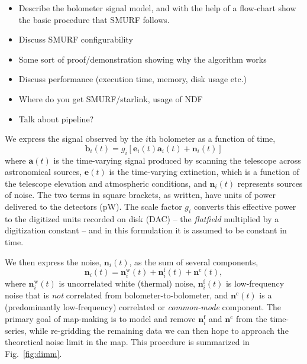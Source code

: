 \documentclass[useAMS,usenatbib,nofootinbib]{mn2e}
\begin{document}
\begin{itemize}

\item Describe the bolometer signal model, and with the help of a flow-chart
show the basic procedure that SMURF follows.

\item Discuss SMURF configurability

\item Some sort of proof/demonstration showing why the algorithm works

\item Discuss performance (execution time, memory, disk usage etc.)

\item Where do you get SMURF/starlink, usage of NDF

\item Talk about pipeline?

\end{itemize}

We express the signal observed by the $i$th bolometer as a function of time,
\begin{equation}
\mathbf{b}_i(t) = g_i[\mathbf{e}_i(t) \mathbf{a}_i(t) + \mathbf{n}_i(t)]
\end{equation}
where $\mathbf{a}(t)$ is the time-varying signal produced by scanning
the telescope across astronomical sources, $\mathbf{e}(t)$ is the
time-varying extinction, which is a function of the telescope
elevation and atmospheric conditions, and $\mathbf{n}_i(t)$ represents
sources of noise. The two terms in square brackets, as written, have
units of power delivered to the detectors (pW). The scale factor $g_i$
converts this effective power to the digitized units recorded on disk
(DAC) -- the \emph{flatfield} multiplied by a digitization constant --
and in this formulation it is assumed to be constant in time.

We then express the noise, $\mathbf{n}_i(t)$, as the sum of several
components,
%
\begin{equation}
  \mathbf{n}_i(t) = \mathbf{n}^\mathrm{w}_i(t) + \mathbf{n}^\mathrm{f}_i(t) +
  \mathbf{n}^\mathrm{c}(t),
\label{eq:noise}
\end{equation}
%
where $\mathbf{n}^\mathrm{w}_i(t)$ is uncorrelated white (thermal)
noise, $\mathbf{n}^\mathrm{f}_i(t)$ is low-frequency noise that is
\emph{not} correlated from bolometer-to-bolometer, and
$\mathbf{n}^\mathrm{c}(t)$ is a (predominantly low-frequency)
correlated or \emph{common-mode} component. The primary goal of
map-making is to model and remove $\mathbf{n}^\mathrm{f}_i$ and
$\mathbf{n}^\mathrm{c}$ from the time-series, while re-gridding the
remaining data we can then hope to approach the theoretical noise
limit in the map. This procedure is summarized in Fig.~\ref{fig:dimm}.
\end{document}
